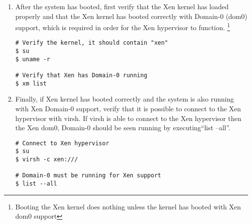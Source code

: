 \begin{enumerate}
\item	After the system has booted, first verify that the Xen kernel has loaded properly and that the Xen kernel has booted
			correctly with Domain-0 (dom0) support, which is required in order for the Xen hypervisor to function. \footnote{Booting
			the Xen kernel does nothing unless the kernel has booted with Xen dom0 support}

\lstset{language=bash,caption=Verify Xen Booted Correctly}
\begin{lstlisting}
# Verify the kernel, it should contain "xen"
$ su
$ uname -r

# Verify that Xen has Domain-0 running
$ xm list
\end{lstlisting}

\item	Finally, if Xen kernel has booted correctly and the system is also running with Xen Domain-0 support, verify that it is
			possible to connect to the Xen hypervisor with virsh. If virsh is able to connect to the Xen hypervisor then the Xen dom0, 
			Domain-0 should be seen running by executing``list --all''.
			
\lstset{language=bash,caption=Verify virsh can Connect to Xen Hypervisor}
\begin{lstlisting}
# Connect to Xen hypervisor
$ su
$ virsh -c xen:///

# Domain-0 must be running for Xen support
$ list --all
\end{lstlisting}
\end{enumerate}




